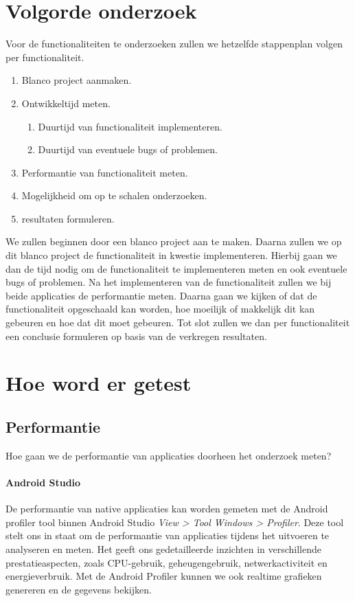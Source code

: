 \section{Volgorde onderzoek}
Voor de functionaliteiten te onderzoeken zullen we hetzelfde stappenplan volgen per functionaliteit. 
\begin{enumerate}
    \item Blanco project aanmaken.
    \item Ontwikkeltijd meten.
    \begin{enumerate}
        \item Duurtijd van functionaliteit implementeren.
        \item Duurtijd van eventuele bugs of problemen.
    \end{enumerate}
    \item Performantie van functionaliteit meten.
    \item Mogelijkheid om op te schalen onderzoeken.
    \item resultaten formuleren.
\end{enumerate}
We zullen beginnen door een blanco project aan te maken. Daarna zullen we op dit blanco project de functionaliteit in kwestie implementeren. 
Hierbij gaan we dan de tijd nodig om de functionaliteit te implementeren meten en ook eventuele bugs of problemen. 
Na het implementeren van de functionaliteit zullen we bij beide applicaties de performantie meten. 
Daarna gaan we kijken of dat de functionaliteit opgeschaald kan worden, hoe moeilijk of makkelijk dit kan gebeuren en hoe dat dit moet gebeuren. 
Tot slot zullen we dan per functionaliteit een conclusie formuleren op basis van de verkregen resultaten.

\section{Hoe word er getest}
\subsection{Performantie}
Hoe gaan we de performantie van applicaties doorheen het onderzoek meten?

\paragraph{Android Studio}
De performantie van native applicaties kan worden gemeten met de Android profiler tool binnen Android Studio 
\textit{View > Tool Windows > Profiler}. Deze tool stelt ons in staat om de performantie van applicaties 
tijdens het uitvoeren te analyseren en meten. Het geeft ons gedetailleerde inzichten 
in verschillende prestatieaspecten, zoals CPU-gebruik, geheugengebruik, netwerkactiviteit en 
energieverbruik. Met de Android Profiler kunnen we ook realtime grafieken genereren en de gegevens bekijken. 

